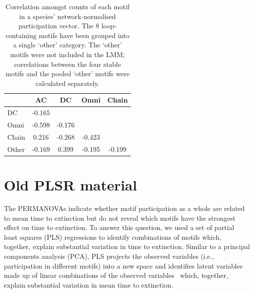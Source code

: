 \documentclass[12pt]{article}
\begin{document}
\begin{spacing}{2.0}
		\begin{table}[h!]
		\caption{Correlation amongst counts of each motif in a species' network-normalised participation vector. The 8 loop-containing motifs have been grouped into a single `other' category. The `other' motifs were not included in the LMM; correlations between the four stable motifs and the pooled `other' motifs were calculated separately.}
		\label{tab:Z_correlations}
		\begin{tabular}{l | c c c c}
			& AC & DC & Omni & Chain \\
		\hline
		DC     & -0.165 &        &        &    \\
		Omni   & -0.598 & -0.176 &        &     \\
		Chain  &  0.216 & -0.268 & -0.423 &      \\
		Other  & -0.169 &  0.399 & -0.195 & -0.199 \\
		\hline
		\end{tabular}
		\end{table}

\clearpage













\section*{Old PLSR material}

	The PERMANOVAs indicate whether motif participation as a whole are related to mean time to extinction but do not reveal which motifs have the strongest effect on time to extinction.
	To answer this question, we used a set of partial least squares (PLS) regressions to identify combinations of motifs which, together, explain substantial variation in time to extinction. 
	Similar to a principal components analysis (PCA), PLS projects the observed variables (i.e., participation in different motifs) into a new space and identifies latent variables made up of linear combinations of the observed variables~\citep{Mevik2004,pls} which, together, explain substantial variation in mean time to extinction.
	

\end{spacing}
\end{document}
